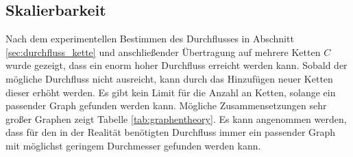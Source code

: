 \subsection{Skalierbarkeit}
Nach dem experimentellen Bestimmen des Durchflusses in Abschnitt \eqref{sec:durchfluss_kette} und anschließender Übertragung auf mehrere Ketten $C$ wurde gezeigt, dass ein enorm hoher Durchfluss erreicht werden kann. Sobald der mögliche Durchfluss nicht ausreicht, kann durch das Hinzufügen neuer Ketten dieser erhöht werden. Es gibt kein Limit für die Anzahl an Ketten, solange ein passender Graph gefunden werden kann. Mögliche Zusammensetzungen sehr großer Graphen zeigt Tabelle \eqref{tab:graphentheory}. Es kann angenommen werden, dass für den in der Realität benötigten Durchfluss immer ein passender Graph mit möglichst geringem Durchmesser gefunden werden kann. \cite{Loz.2010}